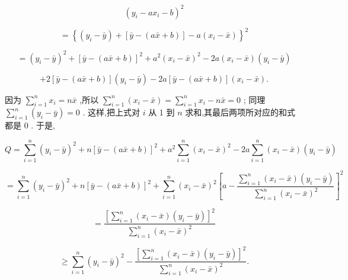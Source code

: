 \documentclass[10pt]{article}
\begin{document}
\[
{\left( {y}_{i} - a{x}_{i} - b\right) }^{2}
\]

\[
= {\left\{  \left( {y}_{i} - \bar{y}\right)  + \left\lbrack  \bar{y} - \left( a\bar{x} + b\right) \right\rbrack   - a\left( {x}_{i} - \bar{x}\right) \right\}  }^{2}
\]

\[
= {\left( {y}_{i} - \bar{y}\right) }^{2} + {\left\lbrack  \bar{y} - \left( a\bar{x} + b\right) \right\rbrack  }^{2} + {a}^{2}{\left( {x}_{i} - \bar{x}\right) }^{2} - {2a}\left( {{x}_{i} - \bar{x}}\right) \left( {{y}_{i} - \bar{y}}\right)
\]

\[
+ 2\left\lbrack  {\bar{y} - \left( {a\bar{x} + b}\right) }\right\rbrack  \left( {{y}_{i} - \bar{y}}\right)  - {2a}\left\lbrack  {\bar{y} - \left( {a\bar{x} + b}\right) }\right\rbrack  \left( {{x}_{i} - \bar{x}}\right) .
\]

因为 \(\mathop{\sum }\limits_{{i = 1}}^{n}{x}_{i} = n\bar{x}\) ,所以 \(\mathop{\sum }\limits_{{i = 1}}^{n}\left( {{x}_{i} - \bar{x}}\right)  = \mathop{\sum }\limits_{{i = 1}}^{n}{x}_{i} - n\bar{x} = 0\) ; 同理 \(\mathop{\sum }\limits_{{i = 1}}^{n}\left( {{y}_{i} - \bar{y}}\right)  = 0\) . 这样,把上式对 \(i\) 从 1 到 \(n\) 求和,其最后两项所对应的和式都是 0 . 于是,

\[
Q = \mathop{\sum }\limits_{{i = 1}}^{n}{\left( {y}_{i} - \bar{y}\right) }^{2} + n{\left\lbrack  \bar{y} - \left( a\bar{x} + b\right) \right\rbrack  }^{2} + {a}^{2}\mathop{\sum }\limits_{{i = 1}}^{n}{\left( {x}_{i} - \bar{x}\right) }^{2} - {2a}\mathop{\sum }\limits_{{i = 1}}^{n}\left( {{x}_{i} - \bar{x}}\right) \left( {{y}_{i} - \bar{y}}\right)
\]

\[
= \mathop{\sum }\limits_{{i = 1}}^{n}{\left( {y}_{i} - \bar{y}\right) }^{2} + n{\left\lbrack  \bar{y} - \left( a\bar{x} + b\right) \right\rbrack  }^{2} + \mathop{\sum }\limits_{{i = 1}}^{n}{\left( {x}_{i} - \bar{x}\right) }^{2}{\left\lbrack  a - \frac{\mathop{\sum }\limits_{{i = 1}}^{n}\left( {{x}_{i} - \bar{x}}\right) \left( {{y}_{i} - \bar{y}}\right) }{\mathop{\sum }\limits_{{i = 1}}^{n}{\left( {x}_{i} - \bar{x}\right) }^{2}}\right\rbrack  }^{2}
\]

\[
= \frac{{\left\lbrack  \mathop{\sum }\limits_{{i = 1}}^{n}\left( {x}_{i} - \bar{x}\right) \left( {y}_{i} - \bar{y}\right) \right\rbrack  }^{2}}{\mathop{\sum }\limits_{{i = 1}}^{n}{\left( {x}_{i} - \bar{x}\right) }^{2}}
\]

\[
\geq  \mathop{\sum }\limits_{{i = 1}}^{n}{\left( {y}_{i} - \bar{y}\right) }^{2} - \frac{{\left\lbrack  \mathop{\sum }\limits_{{i = 1}}^{n}\left( {x}_{i} - \bar{x}\right) \left( {y}_{i} - \bar{y}\right) \right\rbrack  }^{2}}{\mathop{\sum }\limits_{{i = 1}}^{n}{\left( {x}_{i} - \bar{x}\right) }^{2}}.
\]
\end{document}
